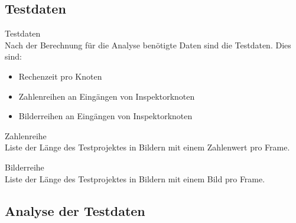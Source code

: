 \subsection{Testdaten}

\begin{speclist}[F]
\setcounter{specnum}{31010}

\spec Testdaten \\
Nach der Berechnung für die Analyse benötigte Daten sind die Testdaten. Dies sind:
\begin{itemize}
	\item Rechenzeit pro Knoten
	\item Zahlenreihen an Eingängen von Inspektorknoten
	\item Bilderreihen an Eingängen von Inspektorknoten
\end{itemize}

\spec Zahlenreihe \\
Liste der Länge des Testprojektes in Bildern mit einem Zahlenwert pro Frame.

\spec Bilderreihe \\
Liste der Länge des Testprojektes in Bildern mit einem Bild pro Frame.

\end{speclist}

\subsection{Analyse der Testdaten}


